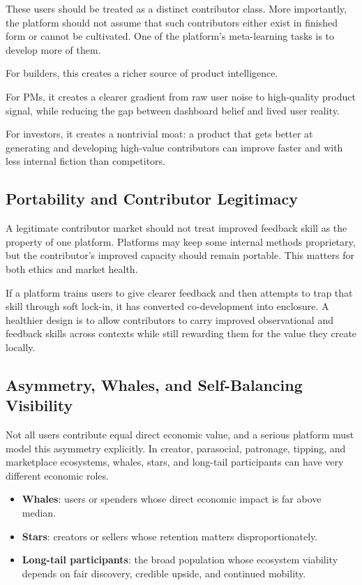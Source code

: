 \documentclass[11pt]{article}
\begin{document}
These users should be treated as a distinct contributor class. More importantly, the platform should not assume that such contributors either exist in finished form or cannot be cultivated. One of the platform's meta-learning tasks is to develop more of them.

For builders, this creates a richer source of product intelligence.

For PMs, it creates a clearer gradient from raw user noise to high-quality product signal, while reducing the gap between dashboard belief and lived user reality.

For investors, it creates a nontrivial moat: a product that gets better at generating and developing high-value contributors can improve faster and with less internal fiction than competitors.

\subsection{Portability and Contributor Legitimacy}

A legitimate contributor market should not treat improved feedback skill as the property of one platform. Platforms may keep some internal methods proprietary, but the contributor's improved capacity should remain portable. This matters for both ethics and market health.

If a platform trains users to give clearer feedback and then attempts to trap that skill through soft lock-in, it has converted co-development into enclosure. A healthier design is to allow contributors to carry improved observational and feedback skills across contexts while still rewarding them for the value they create locally.

\subsection{Asymmetry, Whales, and Self-Balancing Visibility}

Not all users contribute equal direct economic value, and a serious platform must model this asymmetry explicitly. In creator, parasocial, patronage, tipping, and marketplace ecosystems, whales, stars, and long-tail participants can have very different economic roles.

\begin{itemize}
  \item \textbf{Whales}: users or spenders whose direct economic impact is far above median.
  \item \textbf{Stars}: creators or sellers whose retention matters disproportionately.
  \item \textbf{Long-tail participants}: the broad population whose ecosystem viability depends on fair discovery, credible upside, and continued mobility.
\end{itemize}
\end{document}
